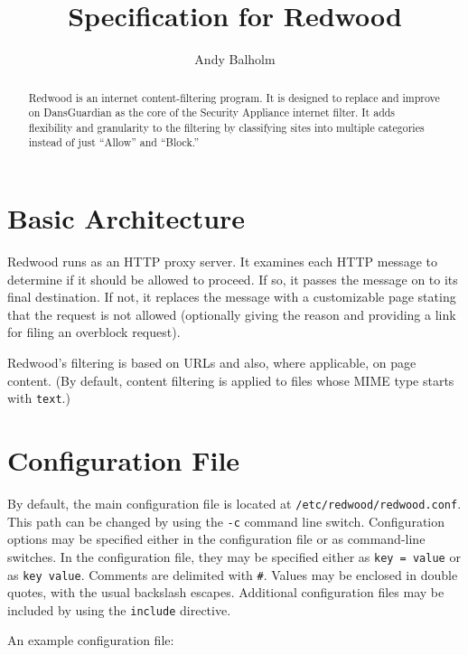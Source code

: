 \documentclass{article}
\title{Specification for Redwood}
\author{Andy Balholm}
\begin{document}
\maketitle

\begin{abstract}

Redwood is an internet content-filtering program. 
It is designed to replace and improve on DansGuardian 
as the core of the Security Appliance internet filter. 
It adds flexibility and granularity to the filtering by classifying sites 
into multiple categories instead of just ``Allow'' and ``Block.'' 

\end{abstract}

\section{Basic Architecture}

Redwood runs as an HTTP proxy server.
It examines each HTTP message to determine if it should be allowed to proceed. 
If so, it passes the message on 
to its final destination. If not, it replaces the message with a customizable page 
stating that the request is not allowed (optionally giving the reason 
and providing a link for filing an overblock request).

Redwood's filtering is based on URLs and also, where applicable, on page content. 
(By default, content filtering is applied to files whose MIME type starts with \verb"text".)

\section{Configuration File}

By default, the main configuration file is located at \verb"/etc/redwood/redwood.conf". 
This path can be changed by using the \verb"-c" command line switch. 
Configuration options may be specified either in the configuration file or as command-line
switches. In the configuration file, they may be specified either as
\verb"key = value" or as \verb"key value". Comments are delimited with \verb"#". 
Values may be enclosed in double quotes, with the usual backslash escapes.
Additional configuration files may be included by using the \verb"include" directive.

An example configuration file:
\end{document}
